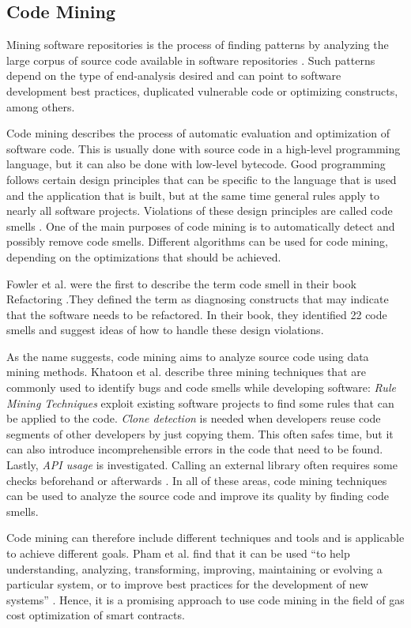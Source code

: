 \documentclass[10pt,conference]{IEEEtran}
\begin{document}
	\subsection{Code Mining}
	Mining software repositories is the process of finding patterns by analyzing the large corpus of source code available in software repositories \cite{msrllm}. Such patterns depend on the type of end-analysis desired and can point to software development best practices, duplicated vulnerable code or optimizing constructs, among others.
	
	Code mining describes the process of automatic evaluation and optimization of software code. This is usually done with source code in a high-level programming language, but it can also be done with low-level bytecode. Good programming follows certain design principles that can be specific to the language that is used and the application that is built, but at the same time general rules apply to nearly all software projects. Violations of these design principles are called code smells \cite{codesmellmining}. One of the main purposes of code mining is to automatically detect and possibly remove code smells. Different algorithms can be used for code mining, depending on the optimizations that should be achieved.
	
	Fowler et al. were the first to describe the term code smell in their book Refactoring \cite{refactoring}.They defined the term as diagnosing constructs that may indicate that the software needs to be refactored. In their book, they identified 22 code smells and suggest ideas of how to handle these design violations.
	
	As the name suggests, code mining aims to analyze source code using data mining methods. Khatoon et al. describe three mining techniques that are commonly used to identify bugs and code smells while developing software: \textit{Rule Mining Techniques} exploit existing software projects to find some rules that can be applied to the code. \textit{Clone detection} is needed when developers reuse code segments of other developers by just copying them. This often safes time, but it can also introduce incomprehensible errors in the code that need to be found. Lastly, \textit{API usage} is investigated. Calling an external library often requires some checks beforehand or afterwards \cite{khatoon}. In all of these areas, code mining techniques can be used to analyze the source code and improve its quality by finding code smells.
	
	Code mining can therefore include different techniques and tools and is applicable to achieve different goals. Pham et al. find that it can be used “to help understanding, analyzing, transforming, improving, maintaining or evolving a particular system, or to improve best practices for the development of new systems” \cite{treemining}. Hence, it is a promising approach to use code mining in the field of gas cost optimization of smart contracts.
	
\end{document}
